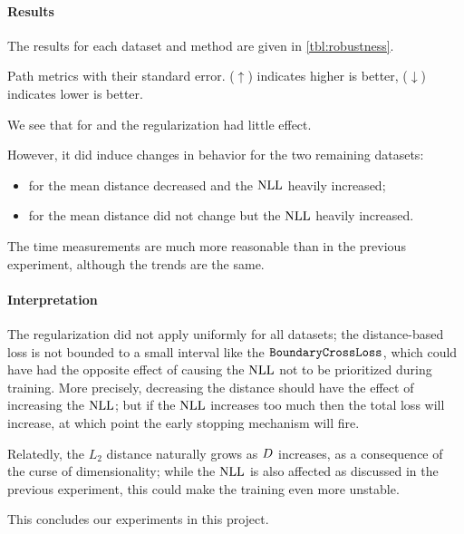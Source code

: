 \documentclass[../main.tex]{subfiles}
\begin{document}
\paragraph{Results}

The results for each dataset and method are given in \autoref{tbl:robustness}.

\begin{table}[h!]
    \centering
    
    \caption{Path metrics with their standard error. ($\uparrow$) indicates higher is better, ($\downarrow$) indicates lower is better.}
    \label{tbl:robustness}
\end{table}

We see that for \CakeOnSea{} and \WineQuality{} the regularization had little effect.

However, it did induce changes in behavior for the two remaining datasets:
\begin{itemize}
    \item for \ForestCover{} the mean distance decreased and the $\text{NLL}$ heavily increased;
    \item for \OnlineNewsPopularity{} the mean distance did not change but the $\text{NLL}$ heavily increased.
\end{itemize}

The time measurements are much more reasonable than in the previous experiment, although the trends are the same.

\paragraph{Interpretation}

The regularization did not apply uniformly for all datasets; the distance-based loss
is not bounded to a small interval like the $\mathtt{BoundaryCrossLoss}$, which could have had the opposite
effect of causing the $\text{NLL}$ not to be prioritized during training.
More precisely, decreasing the distance should have the effect of increasing the $\text{NLL}$;
but if the $\text{NLL}$ increases too much then
the total loss will increase, at which point the early stopping mechanism will fire.

Relatedly, the $L_2$ distance naturally grows as $D$ increases, as a consequence of the curse
of dimensionality; while the $\text{NLL}$ is also affected as discussed in the previous experiment, this
could make the training even more unstable.
 
This concludes our experiments in this project.
\end{document}
